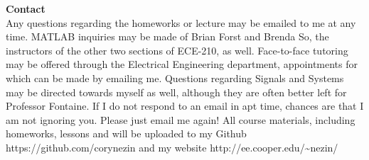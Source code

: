 \documentclass[11pt]{article}
\begin{document}
\textbf{Contact}\\
Any questions regarding the homeworks or lecture may be emailed to me at any time.
MATLAB inquiries may be made of Brian Forst and Brenda So, the instructors of the other two
sections of ECE-210, as well. Face-to-face tutoring may be offered through the Electrical Engineering department, appointments for which can be made by emailing me. Questions regarding
Signals and Systems may be directed towards myself as well, although they are often better left for
Professor Fontaine. If I do not respond to an email in apt time, chances are that I am not ignoring
you. Please just email me again!
All course materials, including homeworks, lessons and will be uploaded to my Github https://github.com/corynezin and my website http://ee.cooper.edu/\textasciitilde nezin/
\end{document}
